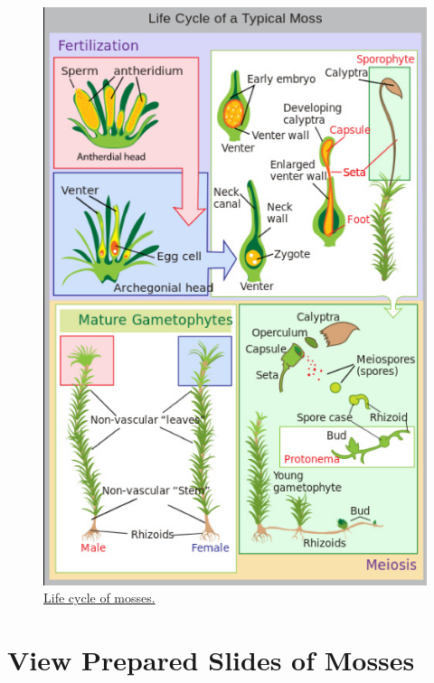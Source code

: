 \begin{figure}

{\centering \includegraphics[width=0.7\linewidth]{./figures/mosses/moss_life_cycle}

}

\caption{\href{https://commons.wikimedia.org/wiki/File:Lifecycle_moss_svg_diagram.svg}{Life
cycle of mosses.}}\label{fig:moss}
\end{figure}

\section{View Prepared Slides of
Mosses}\label{view-the-prepared-slides-of-mosses}

